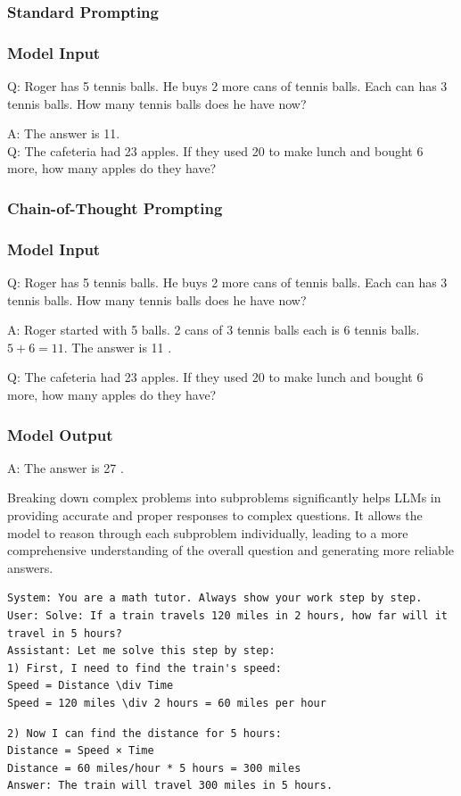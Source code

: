 \documentclass[10pt]{article}
\begin{document}
\subsubsection*{Standard Prompting}
\subsubsection*{Model Input}
Q: Roger has 5 tennis balls. He buys 2 more cans of tennis balls. Each can has 3 tennis balls. How many tennis balls does he have now?

A: The answer is 11.\\
Q: The cafeteria had 23 apples. If they used 20 to make lunch and bought 6 more, how many apples do they have?

\subsubsection*{Chain-of-Thought Prompting}
\subsubsection*{Model Input}
Q: Roger has 5 tennis balls. He buys 2 more cans of tennis balls. Each can has 3 tennis balls. How many tennis balls does he have now?

A: Roger started with 5 balls. 2 cans of 3 tennis balls each is 6 tennis balls. $5+6=11$. The answer is 11 .

Q: The cafeteria had 23 apples. If they used 20 to make lunch and bought 6 more, how many apples do they have?

\subsubsection*{Model Output}
A: The answer is 27 .

Breaking down complex problems into subproblems significantly helps LLMs in providing accurate and proper responses to complex questions. It allows the model to reason through each subproblem individually, leading to a more comprehensive understanding of the overall question and generating more reliable answers.

\begin{example}
	\begin{verbatim}
System: You are a math tutor. Always show your work step by step.
User: Solve: If a train travels 120 miles in 2 hours, how far will it
travel in 5 hours?
Assistant: Let me solve this step by step:
1) First, I need to find the train's speed:
Speed = Distance \div Time
Speed = 120 miles \div 2 hours = 60 miles per hour		
	\end{verbatim}
	
	\begin{verbatim}
2) Now I can find the distance for 5 hours:
Distance = Speed × Time
Distance = 60 miles/hour * 5 hours = 300 miles
Answer: The train will travel 300 miles in 5 hours.		
	\end{verbatim}
\end{example}
\end{document}
